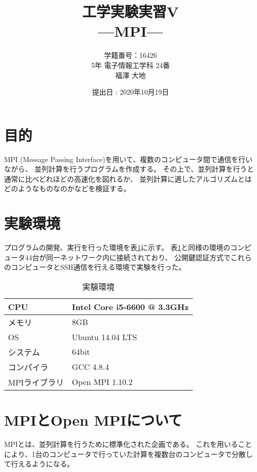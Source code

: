 \documentclass[a4j,titlepage]{jsarticle}
\begin{document}
\begin{titlepage}
  \title{\huge{工学実験実習V} \\ \LARGE{---MPI---}}
	\author{学籍番号：16426 \\ 5年 電子情報工学科 24番 \\ 福澤 大地}
	\date{提出日 : 2020年10月19日}
  \maketitle
\end{titlepage}


\section{目的}
MPI (Message Passing Interface)を用いて、複数のコンピュータ間で通信を行いながら、
並列計算を行うプログラムを作成する。
その上で、並列計算を行うと通常に比べどれほどの高速化を図れるか、
並列計算に適したアルゴリズムとはどのようなものなのかなどを検証する。


\section{実験環境}
プログラムの開発、実行を行った環境を表\ref{tb:kan}に示す。
表\ref{tb:kan}と同様の環境のコンピュータ44台が同一ネットワーク内に接続されており、
公開鍵認証方式でこれらのコンピュータとSSH通信を行える環境で実験を行った。

\begin{table}[H]
  \centering
  \caption{実験環境}
  \label{tb:kan}

  \begin{tabular}{|l|l|}
    \hline
    CPU & Intel Core i5-6600 @ 3.3GHz \\ \hline
    メモリ & 8GB \\ \hline
    OS & Ubuntu 14.04 LTS \\ \hline
    システム & 64bit \\ \hline
    コンパイラ & GCC 4.8.4 \\ \hline
    MPIライブラリ & Open MPI 1.10.2 \\ \hline
  \end{tabular}
\end{table}


\section{MPIとOpen MPIについて}
MPIとは、並列計算を行うために標準化された企画である。
これを用いることにより、1台のコンピュータで行っていた計算を複数台のコンピュータで分散して行えるようになる。
\end{document}
